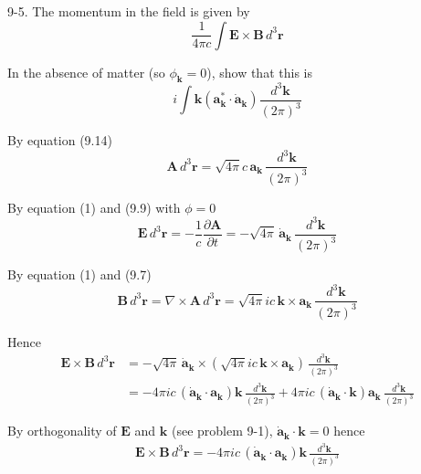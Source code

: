 \documentclass[12pt]{article}
\begin{document}
9-5.
The momentum in the field is given by
\begin{equation*}
\frac{1}{4\pi c}\int
\mathbf E\times\mathbf B\,d^3\mathbf r
\end{equation*}

In the absence of matter (so $\phi_{\mathbf k}=0$),
show that this is
\begin{equation*}
i\int\mathbf k\left(\mathbf a_{\mathbf k}^*\cdot\dot{\mathbf a}_{\mathbf k}\right)
\frac{d^3\mathbf k}{(2\pi)^3}
\end{equation*}

By equation (9.14)
\begin{equation*}
\mathbf A\,d^3\mathbf r=\sqrt{4\pi}c\,\mathbf a_{\mathbf k}\,\frac{d^3\mathbf k}{(2\pi)^3}
\tag{1}
\end{equation*}

By equation (1) and (9.9) with $\phi=0$
\begin{equation*}
\mathbf E\,d^3\mathbf r=-\frac{1}{c}\frac{\partial\mathbf A}{\partial t}
=-\sqrt{4\pi}\,\dot{\mathbf a}_{\mathbf k}\,\frac{d^3\mathbf k}{(2\pi)^3}
\end{equation*}

By equation (1) and (9.7)
\begin{equation*}
\mathbf B\,d^3\mathbf r=\nabla\times\mathbf A\,d^3\mathbf r
=\sqrt{4\pi}ic\,\mathbf k\times\mathbf a_{\mathbf k}
\,\frac{d^3\mathbf k}{(2\pi)^3}
\end{equation*}

Hence
\begin{align*}
\mathbf E\times\mathbf B\,d^3\mathbf r
&=-\sqrt{4\pi}\,\dot{\mathbf a}_{\mathbf k}
\times\left(\sqrt{4\pi}ic\,\mathbf k\times\mathbf a_{\mathbf k}\right)
\,\frac{d^3\mathbf k}{(2\pi)^3}
\\
&=-4\pi ic\,(\dot{\mathbf a}_{\mathbf k}\cdot\mathbf a_{\mathbf k})\mathbf k
\,\frac{d^3\mathbf k}{(2\pi)^3}
+4\pi ic\,(\dot{\mathbf a}_{\mathbf k}\cdot\mathbf k)\mathbf a_{\mathbf k}
\,\frac{d^3\mathbf k}{(2\pi)^3}
\end{align*}

By orthogonality of $\mathbf E$ and $\mathbf k$ (see problem 9-1),
$\dot{\mathbf a}_{\mathbf k}\cdot\mathbf k=0$ hence
\begin{align*}
\mathbf E\times\mathbf B\,d^3\mathbf r
=-4\pi ic\,(\dot{\mathbf a}_{\mathbf k}\cdot\mathbf a_{\mathbf k})\mathbf k\,\frac{d^3\mathbf k}{(2\pi)^3}
\end{align*}
\end{document}
